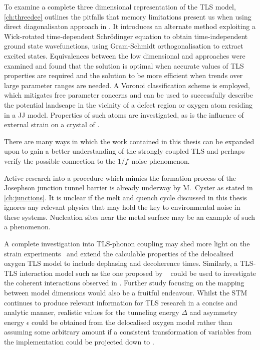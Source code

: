 To examine a complete three dimensional representation of the TLS model, \cref{ch:threedee} outlines the pitfalls that memory limitations present us when using direct diagonalisaton approach in .
It introduces an alternate method exploiting a Wick-rotated time-dependent Schrödinger equation to obtain time-independent ground state wavefunctions, using Gram-Schmidt orthogonalisation to extract excited states.
Equivalences between the low dimensional and  approaches were examined and found that the  solution is optimal when accurate values of TLS properties are required and the  solution to be more efficient when trends over large parameter ranges are needed.
A Voronoi classification scheme is employed, which mitigates free parameter concerns and can be used to successfully describe the potential landscape in the vicinity of a defect region or oxygen atom residing in a JJ model.
Properties of such atoms are investigated, as is the influence of external strain on a crystal of .

\divtext

There are many ways in which the work contained in this thesis can be expanded upon to gain a better understanding of the strongly coupled TLS and perhaps verify the possible connection to the $1/f\,$ noise phenomenon.

Active research into a procedure which mimics the formation process of the Josephson junction tunnel barrier is already underway by M.~Cyster as stated in \cref{ch:junctions}.
It is unclear if the melt and quench cycle discussed in this thesis ignores any relevant physics that may hold the key to environmental noise in these systems.
Nucleation sites near the metal surface may be an example of such a phenomenon.

A complete investigation into TLS-phonon coupling may shed more light on the strain experiments~\cite{Grabovskij2012} and extend the calculable properties of the delocalised oxygen TLS model to include dephasing and decoherence times.
Similarly, a TLS-TLS interaction model such as the one proposed by \citeauthor{Faoro2014}~\cite{Faoro2014} could be used to investigate the coherent interactions observed in .
Further study focusing on the mapping between model dimensions would also be a fruitful endeavour.
Whilst the STM continues to produce relevant information for TLS research in a concise and analytic manner, realistic values for the tunneling energy $\Delta$ and asymmetry energy $\epsilon$ could be obtained from the delocalised oxygen model rather than assuming some arbitrary amount if a consistent transformation of variables from the  implementation could be projected down to .

